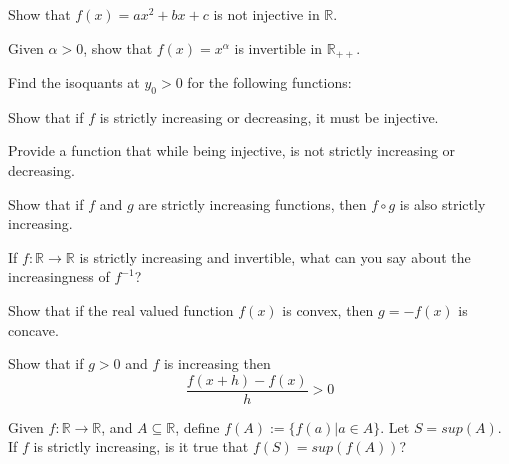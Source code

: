 \documentclass[answers]{exam}
\begin{document}
\begin{questions}
\question Show that $f(x)=ax^2+bx+c$ is not injective in $\mathbb{R}$.

\question Given $\alpha>0$, show that $f(x)=x^\alpha$ is invertible in $\mathbb{R}_{++}$.

\question Find the isoquants at $y_0>0$ for the following functions:


\question Show that if $f$ is strictly increasing or decreasing, it must be injective.

\question Provide a function that while being injective, is not strictly increasing or decreasing.

\question Show that if $f$ and $g$ are strictly increasing functions, then $f\circ g$ is also strictly increasing.

\question If $f:\mathbb{R}\rightarrow\mathbb{R}$ is strictly increasing and invertible, what can you say about the increasingness of $f^{-1}$?

\question Show that if the real valued function $f(x)$ is convex, then $g=-f(x)$ is concave.

\question Show that if $g>0$ and $f$ is increasing then $$\frac{f(x+h)-f(x)}{h}>0$$

\question Given $f:\mathbb{R}\rightarrow\mathbb{R}$, and $A\subseteq \mathbb{R}$, define $f(A):=\{f(a)| a\in A\}$. Let $S=sup(A)$. If $f$ is strictly increasing, is it true that $f(S)=sup(f(A))$?
\end{questions}
\end{document}
